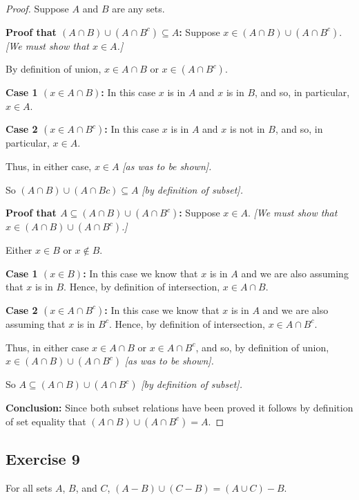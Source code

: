 \documentclass[14pt]{extarticle}
\begin{document}
\begin{proof}
  Suppose $A$ and $B$ are any sets.

    {\bf Proof that \((A \cap B) \cup (A \cap B^c) \subseteq A\):} Suppose \(x \in (A \cap B) \cup (A \cap B^c)\).
    {\it [We must show that \(x \in A\).]}

  By definition of union, \(x \in A \cap B\) or \(x \in (A \cap B^c)\).

    {\bf Case 1 \((x \in A \cap B)\):} In this case $x$ is in $A$ and $x$ is in $B$, and so, in particular, \(x \in A\).

    {\bf Case 2 \((x \in A \cap B^c)\):} In this case $x$ is in $A$ and $x$ is not in $B$, and so, in particular, \(x \in A\).

  Thus, in either case, \(x \in A\) {\it [as was to be shown].}

  So \((A \cap B) \cup (A \cap B c ) \subseteq A\) {\it [by definition of subset].}

    {\bf Proof that \(A \subseteq (A \cap B) \cup (A \cap B^c )\):} Suppose \(x \in A\). {\it [We must show that
        \(x \in (A \cap B) \cup (A \cap B^c)\).]}

  Either \(x \in B\) or \(x \notin B\).

    {\bf Case 1 \((x \in B)\):} In this case we know that $x$ is in $A$ and we are also assuming that $x$ is in $B$.
  Hence, by definition of intersection, \(x \in A \cap B\).

    {\bf Case 2 \((x \in A \cap B^c)\):} In this case we know that $x$ is in $A$ and we are also assuming that $x$ is in
  $B^c$. Hence, by definition of intersection, \(x \in A \cap B^c\).

  Thus, in either case \(x \in A \cap B\) or \(x \in A \cap B^c\), and so, by definition of union, \(x \in (A \cap B)
  \cup (A \cap B^c)\) {\it [as was to be shown].}

  So \(A \subseteq (A \cap B) \cup (A \cap B^c)\) {\it [by definition of subset].}

    {\bf Conclusion:} Since both subset relations have been proved it follows by definition of set equality that
  \((A \cap B) \cup (A \cap B^c) = A\).
\end{proof}

\subsection{Exercise 9}
For all sets $A$, $B$, and $C$, \((A - B) \cup (C - B) = (A \cup C) - B\).
\end{document}
